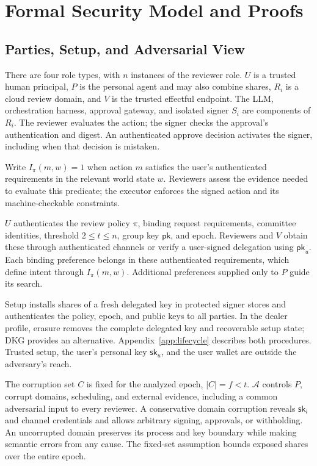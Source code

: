 \documentclass{article}
\newcommand{\sk}{\mathsf{sk}}
\newcommand{\pk}{\mathsf{pk}}
\begin{document}
\section{Formal Security Model and Proofs}
\label{app:security}

\subsection{Parties, Setup, and Adversarial View}

There are four role types, with $n$ instances of the reviewer role.
$U$ is a trusted human principal, $P$ is the personal agent and may also combine
shares, $R_i$ is a cloud review domain, and $V$ is the trusted effectful endpoint.
The LLM, orchestration harness, approval gateway, and isolated signer $S_i$
are components of $R_i$. The reviewer evaluates the action; the signer checks
the approval's authentication and digest. An authenticated approve decision
activates the signer, including when that decision is mistaken.

Write $I_\pi(m,w)=1$ when action $m$ satisfies the user's authenticated
requirements in the relevant world state $w$. Reviewers assess the evidence
needed to evaluate this predicate; the executor enforces the signed action
and its machine-checkable constraints.

$U$ authenticates the review policy $\pi$, binding request requirements,
committee identities, threshold $2\le t\le n$, group key $\pk$, and epoch.
Reviewers and $V$ obtain these through authenticated channels or verify a
user-signed delegation using $\pk_u$. Each binding preference belongs in these
authenticated requirements, which define intent through $I_\pi(m,w)$.
Additional preferences supplied only to $P$ guide its search.

Setup installs shares of a fresh delegated key in protected signer stores and
authenticates the policy, epoch, and public keys to all parties. In the dealer
profile, erasure removes the complete delegated key and recoverable setup
state; DKG provides an alternative. Appendix~\ref{app:lifecycle} describes both
procedures. Trusted setup, the user's personal key $\sk_u$, and the user wallet
are outside the adversary's reach.

The corruption set $C$ is fixed for the analyzed epoch, $|C|=f<t$.
$\mathcal A$ controls $P$, corrupt domains, scheduling, and external evidence,
including a common adversarial input to every reviewer.
A conservative domain corruption reveals $\sk_i$ and channel credentials and
allows arbitrary signing, approvals, or withholding. An uncorrupted domain
preserves its process and key boundary while making semantic errors from any
cause. The fixed-set assumption bounds exposed shares over the entire epoch.
\end{document}
